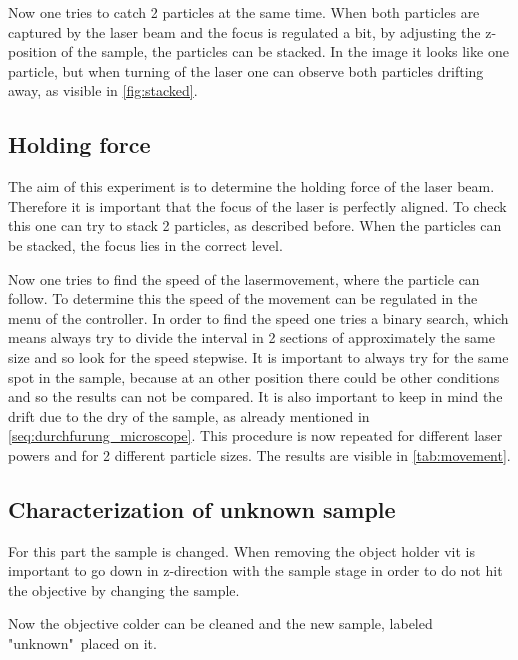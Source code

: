 \documentclass[12pt,english,ngerman]{scrartcl}
\begin{document}

Now one tries to catch 2 particles at the same time. When both particles are captured by the laser beam and the focus is regulated a bit, 
by adjusting the z-position of the sample, the particles can be stacked. In the image it looks like one particle, but when turning of the laser
one can observe both particles drifting away, as visible in \autoref{fig:stacked}.


\subsection{Holding force}

The aim of this experiment is to determine the holding force of the laser beam.
Therefore it is important that the focus of the laser is perfectly aligned. To check this one can try to stack 2 particles, 
as described before. When the particles can be stacked, the focus lies in the correct level.

Now one tries to find the speed of the lasermovement, where the particle can follow. To determine this the speed of the 
movement can be regulated in the menu of the controller. 
In order to find the speed one tries a binary search, which means always try to divide the interval in 2 sections of 
approximately the same size and so look for the speed stepwise.
It is important to always try for the same spot in the sample, because at an other position there could be other conditions 
and so the results can not be compared. It is also important to keep in mind the drift due to the dry of the sample, 
as already mentioned in \autoref{seq:durchfurung_microscope}.
This procedure is now repeated for different laser powers and for 2 different particle sizes.
The results are visible in \autoref{tab:movement}.



\subsection{Characterization of unknown sample}

For this part the sample is changed. When removing the object holder vit is important to go down in z-direction
with the sample stage in order to do not hit the objective by changing the sample.

Now the objective colder can be cleaned and the new sample, labeled "unknown"\  placed on it. 
\end{document}
